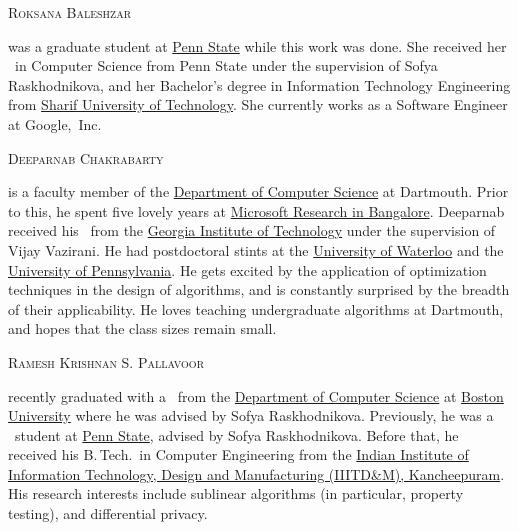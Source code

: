 \documentclass{toc}
\begin{document}
%
%
%
%
%
%
%
%
%
%
%
%
%
%
\begin{tocaboutauthors}
%
%
%
%
%
%
%
%
%
%
%
%
%
%
%
%
%
%
%
%
\begin{tocabout}[baleshzar]
\hypertarget{baleshzarbio}{\textsc{Roksana Baleshzar}}
was a graduate student at \href{https://www.eecs.psu.edu/}{Penn State} while this work was done. She received her \msc\ in Computer Science from Penn State under the supervision of Sofya Raskhodnikova, and her Bachelor's degree in Information Technology Engineering from \href{http://www.en.sharif.edu/}{Sharif University of Technology}. She currently works as a Software Engineer at Google,~Inc.
\end{tocabout}
\begin{tocabout}[chakrabarty]
\hypertarget{chakrabartybio}{\textsc{Deeparnab Chakrabarty}} 
is a faculty member of the \href{https://web.cs.dartmouth.edu/}{Department of Computer Science} at Dartmouth. Prior to this, he spent five lovely years at \href{https://www.microsoft.com/en-us/research/lab/microsoft-research-india/}{Microsoft Research in Bangalore}.
Deeparnab received his  \phd\ from the \href{https://www.cc.gatech.edu/}{Georgia Institute of Technology} under the supervision of Vijay Vazirani.
He had postdoctoral stints at the \href{https://uwaterloo.ca/combinatorics-and-optimization/}{University of Waterloo} and the \href{https://www.cis.upenn.edu/}{University of Pennsylvania}.
		He gets excited by the application of optimization techniques in the design of algorithms, and is constantly surprised by the breadth of their applicability. He loves teaching undergraduate algorithms at Dartmouth, and hopes that the class sizes remain small.
\end{tocabout}
\begin{tocabout}[pallavoor]
\hypertarget{pallavoorbio}{\textsc{Ramesh Krishnan S. Pallavoor}}
recently graduated with a \phd\ from the  
\href{http://www.bu.edu/cs/}{Department of Computer Science} at
\href{http://www.bu.edu/}{Boston University}
where he was advised by Sofya Raskhodnikova.
%
Previously, he  %
was a \phd\ student at \href{https://www.eecs.psu.edu/}{Penn State},
advised by Sofya Raskhodnikova. %
%
%
Before that, he received his B.\,Tech.\ in Computer Engineering from
the %
\href{http://www.iiitdm.ac.in/}{Indian Institute of Information Technology, Design and Manufacturing (IIITD\&M), Kancheepuram}. His research interests include sublinear algorithms (in particular, property testing), and differential privacy.


\end{tocabout}
\end{tocaboutauthors}
\end{document}
